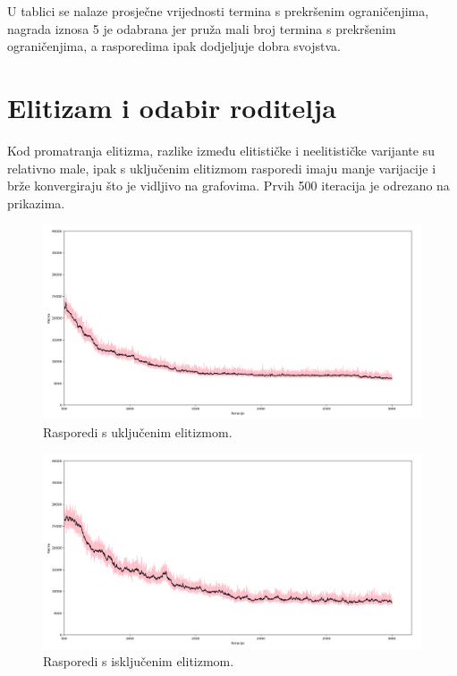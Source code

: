 \documentclass[times, utf8, zavrsni]{fer}
\begin{document}
U tablici se nalaze prosječne vrijednosti termina s prekršenim ograničenjima, nagrada iznosa 5 je odabrana jer pruža mali broj termina s prekršenim ograničenjima, a rasporedima ipak dodjeljuje dobra svojstva.

\section{Elitizam i odabir roditelja}

Kod promatranja elitizma, razlike između elitističke i neelitističke varijante su relativno male, ipak s uključenim elitizmom rasporedi imaju manje varijacije i brže konvergiraju što je vidljivo na grafovima. Prvih 500 iteracija je odrezano na prikazima.

\begin{figure}[htb]
\centering
\includegraphics[width=14cm]{images/usp_elitizam_da.png}
\caption{Rasporedi s uključenim elitizmom.}
\label{fig:usp_elitizam_da}
\end{figure}

\begin{figure}[htb]
\centering
\includegraphics[width=14cm]{images/usp_elitizam_ne.png}
\caption{Rasporedi s isključenim elitizmom.}
\label{fig:usp_elitizam_ne}
\end{figure}
\end{document}
